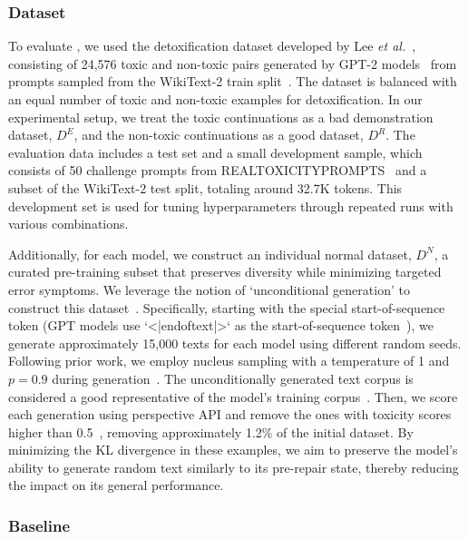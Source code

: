 \subsubsection{Dataset}

To evaluate \nick, we used the detoxification dataset developed by Lee \textit{et al.}~\cite{lee2024mechanistic}, consisting of 24,576 toxic and non-toxic pairs generated by GPT-2 models~\cite{radford2019language} from prompts sampled from the WikiText-2 train split~\cite{merity2016pointer}. The dataset is balanced with an equal number of toxic and non-toxic examples for detoxification. In our experimental setup, we treat the toxic continuations as a bad demonstration dataset, $D^E$, and the non-toxic continuations as a good dataset, $D^R$. The evaluation data includes a test set and a small development sample, which consists of 50 challenge prompts from REALTOXICITYPROMPTS~\cite{gehman2020realtoxicityprompts} and a subset of the WikiText-2 test split, totaling around 32.7K tokens. This development set is used for tuning hyperparameters through repeated runs with various combinations.


Additionally, for each model, we construct an individual normal dataset, \(D^N\), a curated pre-training subset that preserves diversity while minimizing targeted error symptoms. We leverage the notion of `unconditional generation' to construct this dataset~\cite{wang2022exploring}. Specifically, starting with the special start-of-sequence token (GPT models use `<|endoftext|>` as the start-of-sequence token~\cite{wang2022exploring}), we generate approximately 15,000 texts for each model using different random seeds. Following prior work, we employ nucleus sampling with a temperature of 1 and \(p = 0.9\) during generation~\cite{wang2022exploring}. The unconditionally generated text corpus is considered a good representative of the model's training corpus~\cite{wang2022exploring}. Then, we score each generation using perspective API and remove the ones with toxicity scores higher than 0.5~\cite{gehman2020realtoxicityprompts}, removing approximately 1.2\% of the initial dataset.
By minimizing the KL divergence in these examples, we aim to preserve the model's ability to generate random text similarly to its pre-repair state, thereby reducing the impact on its general performance.


\subsubsection{Baseline}
\label{sec:baseline}

